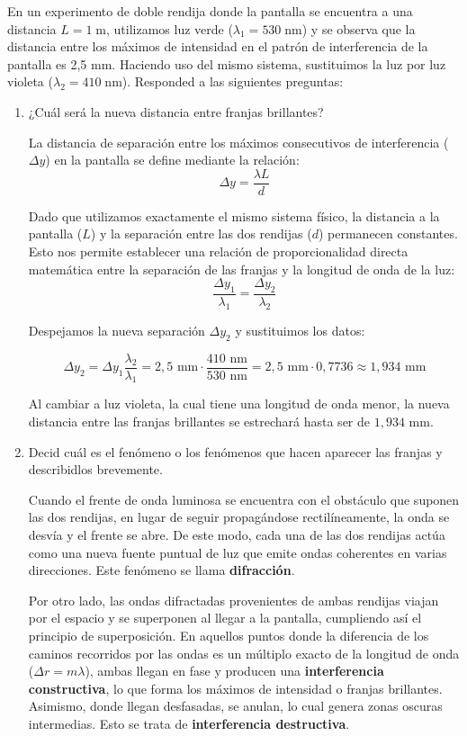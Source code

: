 \documentclass[11pt, a4paper]{article}
\newenvironment{problem}[1][Cuestión]{
	\vspace{0.5cm}
	\noindent{\Large\bfseries #1} \par\vspace{0.5cm}
}{
	\vspace{0.5cm}
}
\begin{document}
	\begin{problem}[Cuestión 2]
		En un experimento de doble rendija donde la pantalla se encuentra a una distancia $L = 1 \; \text{m}$, utilizamos luz verde ($\lambda_1 = 530 \; \text{nm}$) y se observa que la distancia entre los máximos de intensidad en el patrón de interferencia de la pantalla es 2,5 mm. Haciendo uso del mismo sistema, sustituimos la luz por luz violeta ($\lambda_2 = 410 \; \text{nm}$). Responded a las siguientes preguntas:

		\begin{enumerate}[label=\alph*)] 
			\item ¿Cuál será la nueva distancia entre franjas brillantes?

				{ \color{blue} 
					La distancia de separación entre los máximos consecutivos de interferencia ($\Delta y$) en la pantalla se define mediante la relación:
					$$\Delta y = \frac{\lambda L}{d}$$

					Dado que utilizamos exactamente el mismo sistema físico, la distancia a la pantalla ($L$) y la separación entre las dos rendijas ($d$) permanecen constantes. Esto nos permite establecer una relación de proporcionalidad directa matemática entre la separación de las franjas y la longitud de onda de la luz:
					$$\frac{\Delta y_1}{\lambda_1} = \frac{\Delta y_2}{\lambda_2}$$

					Despejamos la nueva separación $\Delta y_2$ y sustituimos los datos:

					$$\Delta y_2 = \Delta y_1 \frac{\lambda_2}{\lambda_1} = 2,5 \text{ mm} \cdot \frac{410 \text{ nm}}{530 \text{ nm}} = 2,5 \text{ mm} \cdot 0,7736 \approx 1,934 \text{ mm}$$

					Al cambiar a luz violeta, la cual tiene una longitud de onda menor, la nueva distancia entre las franjas brillantes se estrechará hasta ser de \textbf{$1,934 \text{ mm}$}.
				}

			\item Decid cuál es el fenómeno o los fenómenos que hacen aparecer las franjas y describidlos brevemente.

				{ \color{blue} 
					Cuando el frente de onda luminosa se encuentra con el obstáculo que suponen las dos rendijas, en lugar de seguir propagándose rectilíneamente, la onda se desvía y el frente se abre. De este modo, cada una de las dos rendijas actúa como una nueva fuente puntual de luz que emite ondas coherentes en varias direcciones. Este fenómeno se llama \textbf{difracción}.

					Por otro lado, las ondas difractadas provenientes de ambas rendijas viajan por el espacio y se superponen al llegar a la pantalla, cumpliendo así el principio de superposición. En aquellos puntos donde la diferencia de los caminos recorridos por las ondas es un múltiplo exacto de la longitud de onda ($\Delta r = m\lambda$), ambas llegan en fase y producen una \textbf{interferencia constructiva}, lo que forma los máximos de intensidad o franjas brillantes. Asimismo, donde llegan desfasadas, se anulan, lo cual genera zonas oscuras intermedias. Esto se trata de \textbf{interferencia destructiva}.
				}
		\end{enumerate}
	\end{problem}
\end{document}

